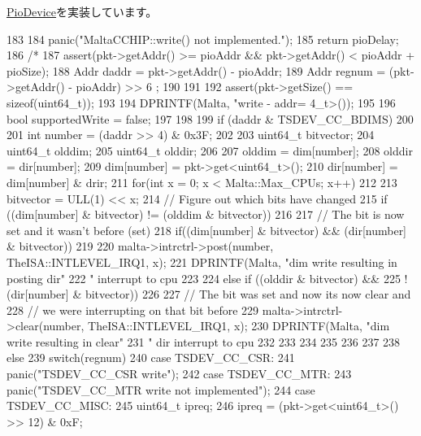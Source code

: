 \hyperlink{classPioDevice_afe8371668d023bb2516b286e5e399b6f}{PioDevice}を実装しています。


\begin{DoxyCode}
183 {
184                 panic("MaltaCCHIP::write() not implemented.");
185                 return pioDelay;
186                 /*
187     assert(pkt->getAddr() >= pioAddr && pkt->getAddr() < pioAddr + pioSize);
188     Addr daddr = pkt->getAddr() - pioAddr;
189     Addr regnum = (pkt->getAddr() - pioAddr) >> 6 ;
190 
191 
192     assert(pkt->getSize() == sizeof(uint64_t));
193 
194     DPRINTF(Malta, "write - addr=%
      4_t>());
195 
196     bool supportedWrite = false;
197 
198 
199     if (daddr & TSDEV_CC_BDIMS)
200     {
201         int number = (daddr >> 4) & 0x3F;
202 
203         uint64_t bitvector;
204         uint64_t olddim;
205         uint64_t olddir;
206 
207         olddim = dim[number];
208         olddir = dir[number];
209         dim[number] = pkt->get<uint64_t>();
210         dir[number] = dim[number] & drir;
211         for(int x = 0; x < Malta::Max_CPUs; x++)
212         {
213             bitvector = ULL(1) << x;
214             // Figure out which bits have changed
215             if ((dim[number] & bitvector) != (olddim & bitvector))
216             {
217                 // The bit is now set and it wasn't before (set)
218                 if((dim[number] & bitvector) && (dir[number] & bitvector))
219                 {
220                     malta->intrctrl->post(number, TheISA::INTLEVEL_IRQ1, x);
221                     DPRINTF(Malta, "dim write resulting in posting dir"
222                             " interrupt to cpu %
223                 }
224                 else if ((olddir & bitvector) &&
225                         !(dir[number] & bitvector))
226                 {
227                     // The bit was set and now its now clear and
228                     // we were interrupting on that bit before
229                     malta->intrctrl->clear(number, TheISA::INTLEVEL_IRQ1, x);
230                     DPRINTF(Malta, "dim write resulting in clear"
231                             " dir interrupt to cpu %
232 
233                 }
234 
235 
236             }
237         }
238     } else {
239         switch(regnum) {
240           case TSDEV_CC_CSR:
241               panic("TSDEV_CC_CSR write\n");
242           case TSDEV_CC_MTR:
243               panic("TSDEV_CC_MTR write not implemented\n");
244           case TSDEV_CC_MISC:
245             uint64_t ipreq;
246             ipreq = (pkt->get<uint64_t>() >> 12) & 0xF;
}}}
\end{DoxyCode}
